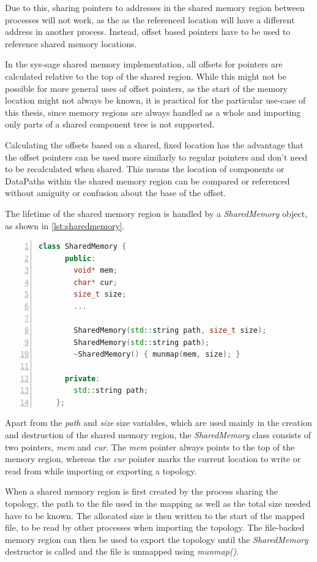 Due to this, sharing pointers to addresses in the shared memory region between processes will not work, as the as the referenced location will have a different address in another process.
Instead, offset based pointers have to be used to reference shared memory locations.

In the sys-sage shared memory implementation, all offsets for pointers are calculated relative to the top of the shared region.
While this might not be possible for more general uses of offset pointers, as the start of the memory location might not always be known,
it is practical for the particular use-case of this thesis, since  memory regions are always handled as a whole and importing only parts of a shared component tree is not supported.

Calculating the offsets based on a shared, fixed location has the advantage that the offset pointers can be used more similarly to regular pointers and don't need to be recalculated when shared.
This means the location of components or DataPaths within the shared memory region can be compared or referenced without amiguity or confusion about the base of the offset.

The lifetime of the shared memory region is handled by a \emph{SharedMemory} object, as shown in \autoref{lst:sharedmemory}.

\begin{lstlisting}[language=c++, numbers=left, caption=SharedMemory Class, captionpos=b, label={lst:sharedmemory}]
    class SharedMemory {
      public:
        void* mem;
        char* cur;
        size_t size;
        ...

        SharedMemory(std::string path, size_t size);
        SharedMemory(std::string path);
        ~SharedMemory() { munmap(mem, size); }

      private:
        std::string path;
    };
\end{lstlisting}

Apart from the \emph{path} and \emph{size} size variables, which are used mainly in the creation and destruction of the shared memory region,
the \emph{SharedMemory} class consists of two pointers, \emph{mem} and \emph{cur}.
The \emph{mem} pointer always points to the top of the memory region, whereas the \emph{cur} pointer marks the current location to write or read from while importing or exporting a topology.

When a shared memory region is first created by the process sharing the topology, the path to the file used in the mapping as well as the total size needed have to be known.
The allocated size is then written to the start of the mapped file, to be read by other processes when importing the topology.
The file-backed memory region can then be used to export the topology until the \emph{SharedMemory} destructor is called and the file is unmapped using \emph{munmap()}.


